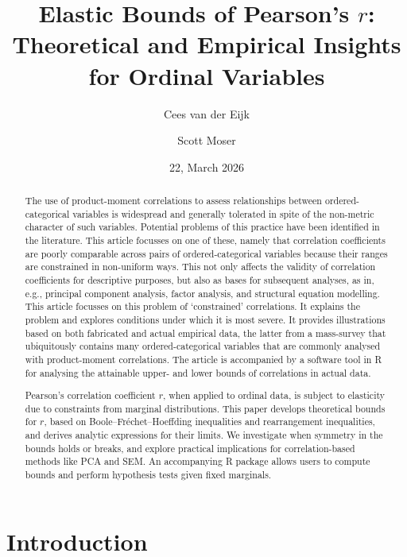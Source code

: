 \documentclass[
  12pt,
]{article}
\title{Elastic Bounds of Pearson's \(r\): Theoretical and Empirical
Insights for Ordinal Variables}
\author{Cees van der Eijk \and Scott Moser}
\date{22, March 2026}
\theoremstyle{plain}
\theoremstyle{definition}
\renewcommand*\contentsname{Table of contents}
\newcommand\contentsname{Table of contents}
\theoremstyle{remark}
\begin{document}
\maketitle

\renewcommand*\contentsname{Table of contents}
{
\hypersetup{linkcolor=}
\setcounter{tocdepth}{3}
\tableofcontents
}

\newpage

\begin{abstract}
The use of product-moment correlations to assess relationships between ordered-categorical variables is widespread and generally tolerated in spite of the non-metric character of such variables. Potential problems of this practice have been identified in the literature. This article focusses on one of these, namely that correlation coefficients are poorly comparable across pairs of ordered-categorical variables because their ranges are constrained in non-uniform ways. This not only affects the validity of correlation coefficients for descriptive purposes, but also as bases for subsequent analyses, as in, e.g., principal component analysis, factor analysis, and structural equation modelling. This article focusses on this problem of ‘constrained’ correlations. It explains the problem and explores conditions under which it is most severe. It provides illustrations based on both fabricated and actual empirical data, the latter from a mass-survey that ubiquitously contains many ordered-categorical variables that are commonly analysed with product-moment correlations. The article is accompanied by a software tool in R for analysing the attainable upper- and lower bounds of correlations in actual data. 

Pearson’s correlation coefficient $r$, when applied to ordinal data, is subject to elasticity due to constraints from marginal distributions. This paper develops theoretical bounds for $r$, based on Boole–Fréchet–Hoeffding inequalities and rearrangement inequalities, and derives analytic expressions for their limits. We investigate when symmetry in the bounds holds or breaks, and explore practical implications for correlation-based methods like PCA and SEM. An accompanying R package allows users to compute bounds and perform hypothesis tests given fixed marginals.
\end{abstract}

\newpage

\newpage

\section{Introduction}\label{sec-intro}
\end{document}
